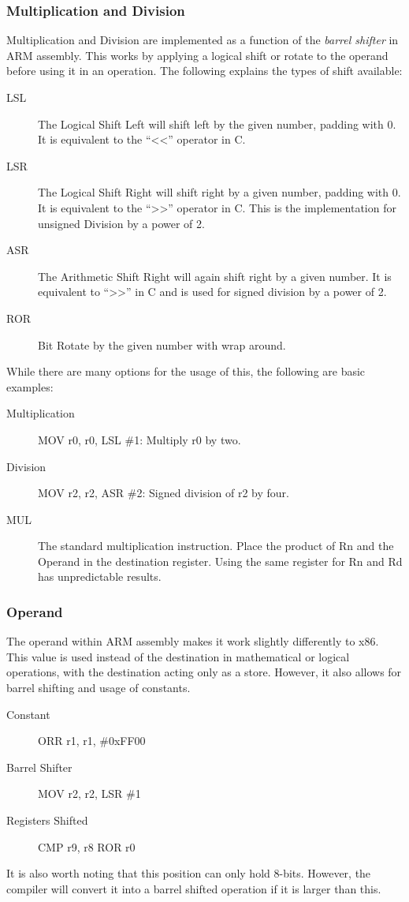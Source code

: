			\subsubsection{Multiplication and Division}
				Multiplication and Division are implemented as a function of the \emph{barrel shifter} in ARM assembly. 
				This works by applying a logical shift or rotate to the operand before using it in an operation. 
				The following explains the types of shift available:
				\begin{description}
					\item[LSL] The Logical Shift Left will shift left by the given number, padding with 0.
						It is equivalent to the ``<<'' operator in C.
					\item[LSR] The Logical Shift Right will shift right by a given number, padding with 0. 
						It is equivalent to the ``>>'' operator in C. 
						This is the implementation for unsigned Division by a power of 2.
					\item[ASR] The Arithmetic Shift Right will again shift right by a given number. 
						It is equivalent to ``>>'' in C and is used for signed division by a power of 2.  
					\item[ROR] Bit Rotate by the given number with wrap around.
				\end{description}
				While there are many options for the usage of this, the following are basic examples:
				\begin{description}
					\item[Multiplication] MOV r0, r0, LSL \#1: Multiply r0 by two. 
					\item[Division] MOV r2, r2, ASR \#2: Signed division of r2 by four. 
					\item[MUL] The standard multiplication instruction. 
						Place the product of Rn and the Operand in the destination register. 
						Using the same register for Rn and Rd has unpredictable results. 
				\end{description}

			\subsubsection{Operand}
				The operand within ARM assembly makes it work slightly differently to x86. 
				This value is used instead of the destination in mathematical or logical operations, with the destination acting only as a store.
				However, it also allows for barrel shifting and usage of constants. 
				\begin{description}
					\item[Constant] ORR r1, r1, \#0xFF00 
					\item[Barrel Shifter] MOV r2, r2, LSR \#1					
					\item[Registers Shifted] CMP r9, r8 ROR r0
				\end{description}
				It is also worth noting that this position can only hold 8-bits. 
				However, the compiler will convert it into a barrel shifted operation if it is larger than this. 


